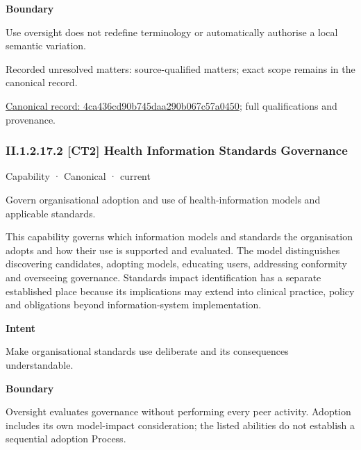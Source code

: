 \textbf{Boundary}



Use oversight does not redefine terminology or automatically authorise a local semantic variation.


{\small Recorded unresolved matters: source-qualified matters; exact scope remains in the canonical record.}\par
{\footnotesize \href{../../../../continuum/strategy/capability/4ca436cd90b745daa290b067c57a0450.md}{Canonical record: 4ca436cd90b745daa290b067c57a0450}; full qualifications and provenance.}\par
\subsubsection*{II.1.2.17.2 [CT2] Health Information Standards Governance}
\label{navigation:II.1.2.17.2}

\label{element:b228039d8e764f9b98cb810b68af329d}
{\small Capability · Canonical · current}\par

Govern organisational adoption and use of health-information models and applicable standards.



This capability governs which information models and standards the organisation adopts and how their use is supported and evaluated. The model distinguishes discovering candidates, adopting models, educating users, addressing conformity and overseeing governance. Standards impact identification has a separate established place because its implications may extend into clinical practice, policy and obligations beyond information-system implementation.



\textbf{Intent}



Make organisational standards use deliberate and its consequences understandable.



\textbf{Boundary}



Oversight evaluates governance without performing every peer activity. Adoption includes its own model-impact consideration; the listed abilities do not establish a sequential adoption Process.


